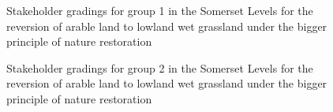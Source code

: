 \documentclass[
  12pt,
  letterpaper,
  DIV=11,
  numbers=noendperiod]{scrartcl}
\begin{document}
\begin{figure}[H]
{}

\caption{\label{fig-SomArMoreG1}Stakeholder gradings for group 1 in the
Somerset Levels for the reversion of arable land to lowland wet
grassland under the bigger principle of nature restoration}

\end{figure}%

\begin{figure}[H]


\caption{\label{fig-SomArMoreG2}Stakeholder gradings for group 2 in the
Somerset Levels for the reversion of arable land to lowland wet
grassland under the bigger principle of nature restoration}

\end{figure}%
\end{document}
